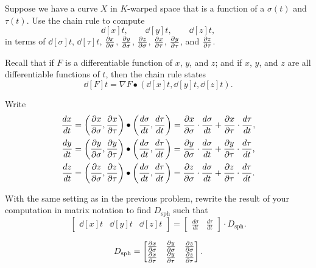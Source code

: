 \documentclass{ximera}
\begin{document}
\begin{problem}
Suppose we have a curve $X$ in $K$-warped space that is a function of
a $\sigma(t)$ and $\tau(t)$. Use the chain rule to compute
\[
\dd[x]{t},\qquad \dd[y]{t}, \qquad \dd[z]{t},
\]
in terms of $\dd[\sigma]{t}$, $\dd[\tau]{t}$, $\pp[x]{\sigma}$,
$\pp[y]{\sigma}$, $\pp[z]{\sigma}$, $\pp[x]{\tau}$, $\pp[y]{\tau}$,
and $\pp[z]{\tau}$.
\begin{hint}
  Recall that if $F$ is a differentiable function of $x$, $y$, and
  $z$; and if $x$, $y$, and $z$ are all differentiable functions of
  $t$, then the chain rule states
  \[
\dd[F]{t} = \nabla F \bullet\left(\dd[x]{t},\dd[y]{t},\dd[z]{t}\right).
  \]
\end{hint}
\begin{freeResponse}
  Write
  \begin{align*}
    \dd[x]{t} &= \left(\pp[x]{\sigma},\pp[x]{\tau}\right)\bullet\left(\dd[\sigma]{t},\dd[\tau]{t}\right) = \pp[x]{\sigma}\cdot\dd[\sigma]{t}+\pp[x]{\tau}\cdot\dd[\tau]{t}, \\
    \dd[y]{t} &= \left(\pp[y]{\sigma},\pp[y]{\tau}\right)\bullet\left(\dd[\sigma]{t},\dd[\tau]{t}\right) = \pp[y]{\sigma}\cdot\dd[\sigma]{t}+\pp[y]{\tau}\cdot\dd[\tau]{t}, \\
    \dd[z]{t} &= \left(\pp[z]{\sigma},\pp[z]{\tau}\right)\bullet\left(\dd[\sigma]{t},\dd[\tau]{t}\right) = \pp[z]{\sigma}\cdot\dd[\sigma]{t}+\pp[z]{\tau}\cdot\dd[\tau]{t}.  
  \end{align*}
\end{freeResponse}
\end{problem}

\begin{problem}
  With the same setting as in the previous problem, rewrite the result
  of your computation in matrix notation to find $D_{\mathrm{sph}}$ such
  that
\[
\begin{bmatrix}
\dd[x]{t} & \dd[y]{t} & \dd[z]{t}
\end{bmatrix}
=
\begin{bmatrix}
\frac{d\sigma}{dt} & \frac{d\tau}{dt}
\end{bmatrix}\cdot D_{\mathrm{sph}}.
\]
\begin{freeResponse}
  \[
  D_{\mathrm{sph}} =
  \begin{bmatrix}
    \pp[x]{\sigma} & \pp[y]{\sigma} & \pp[z]{\sigma} \\
    \pp[x]{\tau}   & \pp[y]{\tau}   & \pp[z]{\tau}
  \end{bmatrix}.
  \]
\end{freeResponse}
\end{problem}
\end{document}
